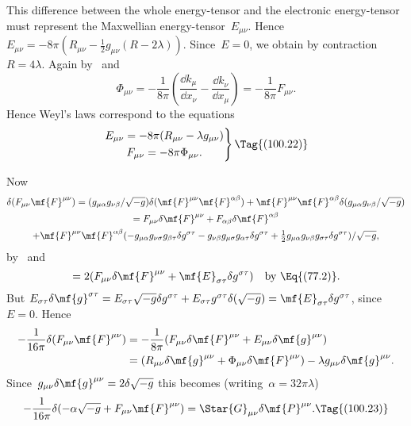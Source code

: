 \documentclass[12pt]{book}
\begin{document}
This difference between the whole energy\hyp{}tensor and the electronic energy\hyp{}tensor must represent the
Maxwellian energy\hyp{}tensor~$E_{\mu\nu}$.
Hence~$E_{\mu\nu}=-8\pi(R_{\mu\nu}-\tfrac{1}{2}g_{\mu\nu}(R-2\lambda))$.
Since~$E=0$, we obtain by contraction~$R=4\lambda$.
Again by~ and~
\[
\Phi_{\mu\nu}=-\frac{1}{8\pi}\left(\frac{\dd k_\mu}{\dd x_\nu}-\frac{\dd k_\nu}{\dd x_\mu}\right)
             =-\frac{1}{8\pi}F_{\mu\nu}.
\]
Hence Weyl's laws correspond to the equations
\[
\left.
\begin{gathered}
E_{\mu\nu} = -8\pi (R_{\mu\nu} - \lambda g_{\mu\nu})\\
F_{\mu\nu} = -8\pi \Phi_{\mu\nu}.
\end{gathered}
\right\}
\Tag{(100.22)}
\]

Now
\begin{multline*}%
\delta(F_{\mu\nu}\mf{F}^{\mu\nu}) =
   (g_{\mu\alpha}g_{\nu\beta}/\sqrt{-g})\delta(\mf{F}^{\mu\nu}\mf{F}^{\alpha\beta})
   + \mf{F}^{\mu\nu}\mf{F}^{\alpha\beta}\delta(g_{\mu\alpha}g_{\nu\beta}/\sqrt{-g})\\
 = F_{\mu\nu}\delta\mf{F}^{\mu\nu} + F_{\alpha\beta}\delta\mf{F}^{\alpha\beta}\\
     +\mf{F}^{\mu\nu}\mf{F}^{\alpha\beta}(-g_{\mu\alpha}g_{\nu\sigma}g_{\beta\tau}\delta g^{\sigma\tau}
      -g_{\nu\beta}g_{\mu\sigma}g_{\alpha\tau}\delta g^{\sigma\tau}
 + \tfrac{1}{2}g_{\mu\alpha}g_{\nu\beta}g_{\sigma\tau}\delta g^{\sigma\tau})/\sqrt{-g},
\end{multline*}
by~ and~
\[
= 2(F_{\mu\nu}\delta\mf{F}^{\mu\nu} + \mf{E}_{\sigma\tau}\delta g^{\sigma\tau})\quad\text{by~\Eq{(77.2)}}.
\]
But $E_{\sigma\tau}\delta\mf{g}^{\sigma\tau}=E_{\sigma\tau}\sqrt{-g}\delta g^{\sigma\tau}+E_{\sigma\tau}g^{\sigma\tau}\delta(\sqrt{-g})=\mf{E}_{\sigma\tau}\delta g^{\sigma\tau}$, since~$E=0$.
Hence
\begin{align*}
-\frac{1}{16\pi}\delta(F_{\mu\nu}\mf{F}^{\mu\nu}) & = -\frac{1}{8\pi}(F_{\mu\nu}\delta\mf{F}^{\mu\nu} +
    E_{\mu\nu}\delta\mf{g}^{\mu\nu})\\
   & = (R_{\mu\nu}\delta\mf{g}^{\mu\nu} + \Phi_{\mu\nu}\delta\mf{F}^{\mu\nu})-\lambda g_{\mu\nu}\delta\mf{g}^{\mu\nu}.
\end{align*}
Since~$g_{\mu\nu}\delta\mf{g}^{\mu\nu}=2\delta\sqrt{-g}$ this becomes (writing~$\alpha=32\pi\lambda$)
\[
-\frac{1}{16\pi}\delta(-\alpha\sqrt{-g}+F_{\mu\nu}\mf{F}^{\mu\nu}) = \Star{G}_{\mu\nu}\delta\mf{P}^{\mu\nu}.
\Tag{(100.23)}
\]
\end{document}
